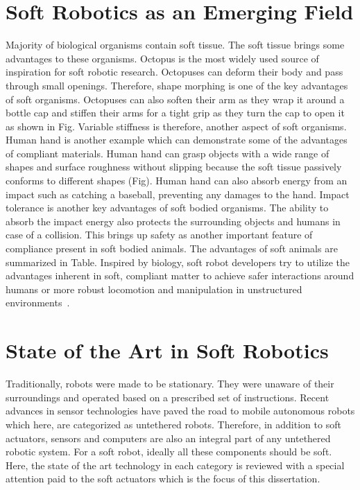 \section{Soft Robotics as an Emerging Field}
\label{sec:emerging}
Majority of biological organisms contain soft tissue. The soft tissue brings some advantages to these organisms. Octopus is the most widely used source of inspiration for soft robotic research. Octopuses can deform their body and pass through small openings. Therefore, shape morphing is one of the key advantages of soft organisms. Octopuses can also soften their arm as they wrap it around a bottle cap and stiffen their arms for a tight grip as they turn the cap to open it as shown in Fig. Variable stiffness is therefore, another aspect of soft organisms. Human hand is another example which can demonstrate some of the advantages of compliant materials. Human hand can grasp objects with a wide range of shapes and surface roughness without slipping because the soft tissue passively conforms to different shapes (Fig). Human hand can also absorb energy from an impact such as catching a baseball, preventing any damages to the hand. Impact tolerance is another key advantages of soft bodied organisms. The ability to absorb the impact energy also protects the surrounding objects and humans in case of a collision. This brings up safety as another important feature of compliance present in soft bodied animals. The advantages of soft animals are summarized in Table. Inspired by biology, soft robot developers try to utilize the advantages inherent in soft, compliant matter to achieve safer interactions around humans or more robust locomotion and manipulation in unstructured environments~\cite{martinez2013,laschi2012,Tolley2014d,AdamBilodeau2015}.

\section{State of the Art in Soft Robotics}
Traditionally, robots were made to be stationary. They were unaware of their surroundings and operated based on a prescribed set of instructions. Recent advances in sensor technologies have paved the road to mobile autonomous robots which here, are categorized as untethered robots. Therefore, in addition to soft actuators, sensors and computers are also an integral part of any untethered robotic system. For a soft robot, ideally all these components should be soft. Here, the state of the art technology in each category is reviewed with a special attention paid to the soft actuators which is the focus of this dissertation. 
